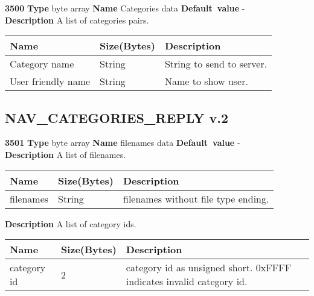\documentclass[a4paper]{article}
\begin{document}
\begin{list}{\textbf{ParamID}}{}
\item \textbf{3500} \textbf{Type} byte array \textbf{Name} Categories data
                 \textbf{Default~value} - \\
  \textbf{Description} A list of categories pairs.

  \begin{tabular}{|l|l|p{50mm}|}
    \hline
    Name               & Size(Bytes) & Description               \\\hline
    Category name      & String      & String to send to server. \\\hline
    User friendly name & String      & Name to show user.        \\\hline
  \end{tabular}
\end{list}

\subsection{NAV\_CATEGORIES\_REPLY v.2}
\begin{list}{\textbf{ParamID}}{}
\item \textbf{3501} \textbf{Type} byte array \textbf{Name} filenames data
                 \textbf{Default~value} - \\
  \textbf{Description} A list of filenames.

  \begin{tabular}{|l|l|p{50mm}|}
    \hline
    Name               & Size(Bytes) & Description               \\\hline
    filenames          & String      & filenames without file type ending. \\\hline
  \end{tabular}
  \textbf{Description} A list of category ids.

  \begin{tabular}{|l|l|p{50mm}|}
    \hline
    Name               & Size(Bytes) & Description               \\\hline
    category id          & 2      & category id as unsigned short. 0xFFFF indicates
    invalid category id. \\\hline
  \end{tabular}
\end{list}
\end{document}
